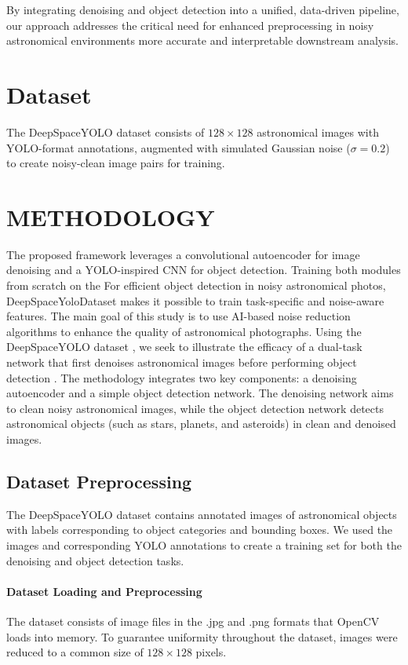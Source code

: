 \documentclass[12pt, conference]{IEEEtran}
\begin{document}
By integrating denoising and object detection into a unified, data-driven pipeline, our approach addresses the critical need for enhanced preprocessing in noisy astronomical environments more accurate and interpretable downstream analysis.
\section{Dataset}

The DeepSpaceYOLO dataset \cite{deepspaceyolo} consists of $128 \times 128$ astronomical images with YOLO-format annotations, augmented with simulated Gaussian noise ($\sigma = 0.2$) to create noisy-clean image pairs for training.

\section{METHODOLOGY}
The proposed framework leverages a convolutional autoencoder for image denoising and a YOLO-inspired \cite{redmon2016you} CNN for object detection. Training both modules from scratch on the For efficient object detection in noisy astronomical photos, DeepSpaceYoloDataset \cite{deepspaceyolo} makes it possible to train task-specific and noise-aware features. The main goal of this study is to use AI-based noise reduction algorithms to enhance the quality of astronomical photographs. Using the DeepSpaceYOLO dataset \cite{deepspaceyolo}, we seek to illustrate the efficacy of a dual-task network that first denoises astronomical images before performing object detection \cite{deepspaceyolo}. 
The methodology integrates two key components: a denoising autoencoder and a simple object detection network. The denoising network aims to clean noisy astronomical images, while the object detection network detects astronomical objects (such as stars, planets, and asteroids) in clean and denoised images.
\subsection{Dataset Preprocessing}\label{AA}
The DeepSpaceYOLO dataset \cite{deepspaceyolo} contains annotated images of astronomical objects with labels corresponding to object categories and bounding boxes. We used the images and corresponding YOLO \cite{redmon2016you} annotations to create a training set for both the denoising and object detection tasks.
\paragraph{Dataset Loading and Preprocessing}
The dataset consists of image files in the .jpg and .png formats that OpenCV loads into memory. To guarantee uniformity throughout the dataset, images were reduced to a common size of $128 \times 128$ pixels.
\end{document}
